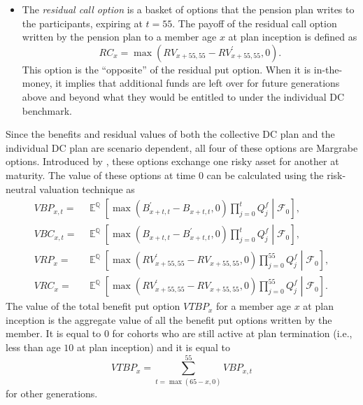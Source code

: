 \documentclass{sfuthesis}
\DeclareMathOperator{\E}{\mathbb{E}}
\numberwithin{equation}{chapter}
\begin{document}
\begin{itemize}
			\item The \textit{residual call option} is a basket of options that the pension plan writes to the participants, expiring at $t=55$. The payoff of the residual call option written by the pension plan to a member age $x$ at plan inception is defined as
			\begin{equation}
			\label{eq:VB_18}
			RC_{x} = \max(RV_{x+55,55} - RV^{'}_{x+55,55},0).
			\end{equation}
			This option is the ``opposite'' of the residual put option. When it is in-the-money, it implies that additional funds are left over for future generations above and beyond what they would be entitled to under the individual DC benchmark.
		\end{itemize}
	
	
		\justify
		Since the benefits and residual values of both the collective DC plan and the individual DC plan are scenario dependent, all four of these options are Margrabe options. Introduced by \citet{Margrabe1978}, these options exchange one risky asset for another at maturity. The value of these options at time $0$ can be calculated using the risk-neutral valuation technique as 
		\begin{align}		
		VBP_{x,t} = &\, \E^{\mathbb{Q}} \left[\max(B_{x+t,t}^{'}-B_{x+t,t},0)\prod_{j=0}^{t}Q_{j}^f \middle|\mathcal{F}_{0} \right], \label{eq:VB_21}\\
		VBC_{x,t} = &\, \E^{\mathbb{Q}} \left[\max(B_{x+t,t}-B_{x+t,t}^{'},0)\prod_{j=0}^{t}Q_{j}^f \middle|\mathcal{F}_{0} \right], \label{eq:VB_22}\\
		VRP_{x} = &\,\E^{\mathbb{Q}} \left[\max(RV_{x+55,55}^{'}-RV_{x+55,55},0)\prod_{j=0}^{55}Q_{j}^f \middle|\mathcal{F}_{0} \right], \label{eq:VB_23}\\
		VRC_{x} = &\,\E^{\mathbb{Q}} \left[\max(RV_{x+55,55}^{'}-RV_{x+55,55},0)\prod_{j=0}^{55}Q_{j}^f \middle|\mathcal{F}_{0} \right].
		\label{eq:VB_24}
		\end{align}
		\justify
		The value of the total benefit put option $VTBP_{x}$ for a member age $x$ at plan inception is the aggregate value of all the benefit put options written by the member. It is equal to $0$ for cohorts who are still active at plan termination (i.e., less than age $10$ at plan inception) and it is equal to
		\begin{equation}
		\label{eq:VB_19}
		VTBP_{x} = \sum_{t=\max(65-x,0)}^{55} VBP_{x,t}
		\end{equation}
		for other generations. 
	
\end{document}
